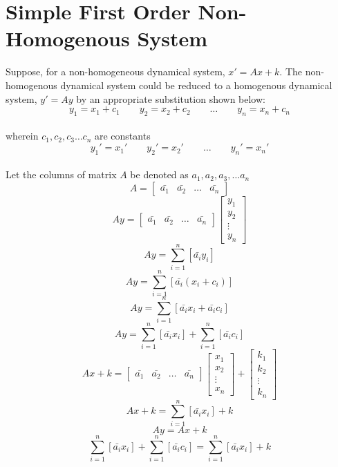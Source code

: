 \section{Simple First Order Non-Homogenous System}
\begin{comment}
\end{comment}
Suppose, for a non-homogeneous dynamical system, $x' = Ax + k$. The non-homogenous dynamical system could be reduced to a homogenous dynamical system, $y' = Ay$ by an appropriate substitution shown below:  
$$y_1 = x_1 + c_1 \qquad y_2 = x_2 + c_2 \qquad \dots \qquad y_n = x_n + c_n $$
\\wherein $c_1, c_2, c_3 \dots c_n$ are constants
$$y_1' = x_1' \qquad y_2' = x_2' \qquad \dots \qquad y_n' = x_n'$$
\\Let the columns of matrix $A$ be denoted as $a_1, a_2, a_3,\dots a_n$
$$A = \begin{bmatrix} \bar{a_1} & \bar{a_2} &\dots & \bar{a_n} \end{bmatrix}$$
$$Ay = \begin{bmatrix} \bar{a_1} & \bar{a_2} &\dots & \bar{a_n} \end{bmatrix} \begin{bmatrix}y_1 \\ y_2 \\ \vdots \\ y_n \end{bmatrix}$$
$$Ay = \sum_{i = 1} ^ {n} \left[\bar{a_i}y_i\right]$$
$$Ay = \sum_{i = 1} ^ {n} \left[\bar{a_i}(x_i +c_i)\right]$$
$$Ay = \sum_{i = 1} ^ {n} \left[\bar{a_i}x_i + \bar{a_i}c_i\right]$$
$$Ay = \sum_{i = 1} ^ {n} \left[\bar{a_i}x_i\right] + \sum_{i = 1} ^ {n} \left[\bar{a_i}c_i\right]$$
$$Ax + k= \begin{bmatrix} \bar{a_1} & \bar{a_2} &\dots & \bar{a_n} \end{bmatrix} \begin{bmatrix}x_1 \\ x_2 \\ \vdots \\ x_n \end{bmatrix} + \begin{bmatrix} k_1 \\k_2 \\\vdots \\k_n\end{bmatrix}$$
$$Ax + k = \sum_{i = 1}^{n} \left[\bar{a_i}x_i\right] + k$$
$$Ay = Ax + k$$
$$\sum_{i = 1} ^ {n} \left[\bar{a_i}x_i\right] + \sum_{i = 1} ^ {n} \left[\bar{a_i}c_i\right] = \sum_{i = 1}^{n} \left[\bar{a_i}x_i\right] + k$$
